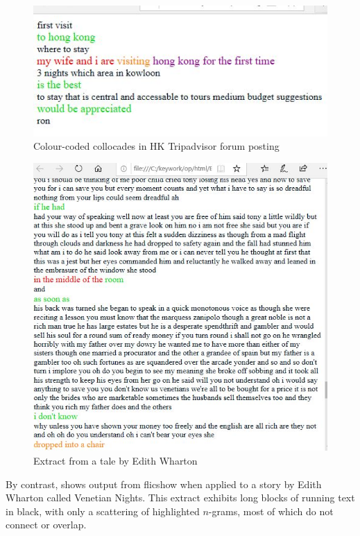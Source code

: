 \documentclass[output=paper]{langscibook}
\begin{document}
  

\begin{figure}
\includegraphics[width=\textwidth]{figures/forsyth-img002.jpg}
\caption{Colour-coded collocades in HK Tripadvisor forum posting}
\label{fig:forsyth:2}
\end{figure}



\begin{figure}
\includegraphics[width=\textwidth]{figures/forsyth-img003.jpg}
\caption{Extract from a tale by Edith Wharton}
\label{fig:forsyth:3}
\end{figure}

By contrast,  shows output from flicshow when applied to a story by Edith Wharton called Venetian Nights. This extract exhibits long blocks of running text in black, with only a scattering of highlighted $n$-grams, most of which do not connect or overlap.
\end{document}
